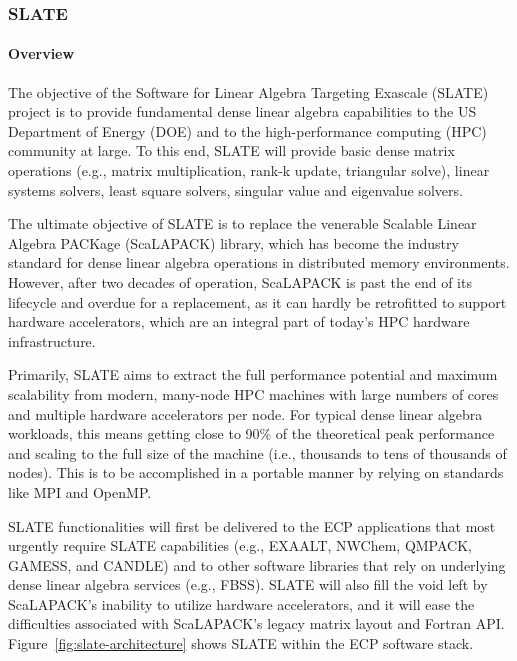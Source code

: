 \subsubsection{SLATE}\label{subsubsect:slate}


\paragraph{Overview}

The objective of the Software for Linear Algebra Targeting Exascale 
(SLATE) project is to provide fundamental dense linear algebra capabilities
to the US Department of Energy (DOE) and to the high-performance 
computing (HPC) community at large.
To this end, SLATE will provide basic dense matrix operations (e.g., matrix multiplication,
rank-k update, triangular solve),
linear systems solvers, least square solvers, singular value
and eigenvalue solvers.

The ultimate objective of SLATE is to replace the
venerable Scalable Linear Algebra PACKage (ScaLAPACK) library, 
which has become the industry standard
for dense linear algebra operations in distributed memory environments.
However, after two decades of operation, ScaLAPACK is past the end of its lifecycle
and overdue for a replacement, as it can hardly be retrofitted
to support hardware accelerators, which are an integral part of today's HPC
hardware infrastructure.

Primarily, SLATE aims to extract the full performance potential and maximum 
scalability from modern, many-node HPC machines with large numbers of cores
and multiple hardware accelerators per node.
For typical dense linear algebra workloads, this means getting close to 90\% 
of the theoretical peak performance and scaling to the full size of the machine
(i.e., thousands to tens of thousands of nodes).
This is to be accomplished in a portable manner by relying on standards like 
MPI and OpenMP.

SLATE functionalities will first be delivered to the ECP applications
that most urgently require SLATE capabilities 
(e.g., EXAALT, NWChem, QMPACK, GAMESS, and CANDLE)
and to other software libraries 
that rely on underlying dense linear algebra services (e.g., FBSS).
SLATE will also fill the void left by ScaLAPACK's inability to utilize
hardware accelerators, and it will ease the difficulties associated with ScaLAPACK's
legacy matrix layout and Fortran API.
Figure~\ref{fig:slate-architecture} shows SLATE within 
the ECP software stack.

